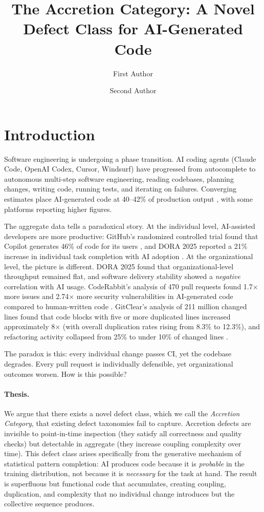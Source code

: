 \documentclass[11pt, a4paper, copyright]{googledeepmind}
\title{The Accretion Category: A Novel Defect Class for AI-Generated Code}
\author[1]{First Author}
\author[1]{Second Author}
\affil[1]{Affiliation 1}
\begin{document}
\maketitle

\section{Introduction}
\label{sec:intro}

Software engineering is undergoing a phase transition. AI coding agents (Claude Code, OpenAI Codex, Cursor, Windsurf) have progressed from autocomplete to autonomous multi-step software engineering, reading codebases, planning changes, writing code, running tests, and iterating on failures. Converging estimates place AI-generated code at 40--42\% of production output \citep{gitclear2025, sonar2026}, with some platforms reporting higher figures.

The aggregate data tells a paradoxical story. At the individual level, AI-assisted developers are more productive: GitHub's randomized controlled trial found that Copilot generates 46\% of code for its users \citep{github2024rct}, and DORA 2025 reported a 21\% increase in individual task completion with AI adoption \citep{dora2025}. At the organizational level, the picture is different. DORA 2025 found that organizational-level throughput remained flat, and software delivery stability showed a \emph{negative} correlation with AI usage. CodeRabbit's analysis of 470 pull requests found 1.7$\times$ more issues and 2.74$\times$ more security vulnerabilities in AI-generated code compared to human-written code \citep{coderabbit2025}. GitClear's analysis of 211 million changed lines found that code blocks with five or more duplicated lines increased approximately 8$\times$ (with overall duplication rates rising from 8.3\% to 12.3\%), and refactoring activity collapsed from 25\% to under 10\% of changed lines \citep{gitclear2025}.

The paradox is this: every individual change passes CI, yet the codebase degrades. Every pull request is individually defensible, yet organizational outcomes worsen. How is this possible?

\paragraph{Thesis.} We argue that there exists a novel defect class, which we call the \emph{Accretion Category}, that existing defect taxonomies fail to capture. Accretion defects are invisible to point-in-time inspection (they satisfy all correctness and quality checks) but detectable in aggregate (they increase coupling complexity over time). This defect class arises specifically from the generative mechanism of statistical pattern completion: AI produces code because it is \emph{probable} in the training distribution, not because it is \emph{necessary} for the task at hand. The result is superfluous but functional code that accumulates, creating coupling, duplication, and complexity that no individual change introduces but the collective sequence produces.
\end{document}
